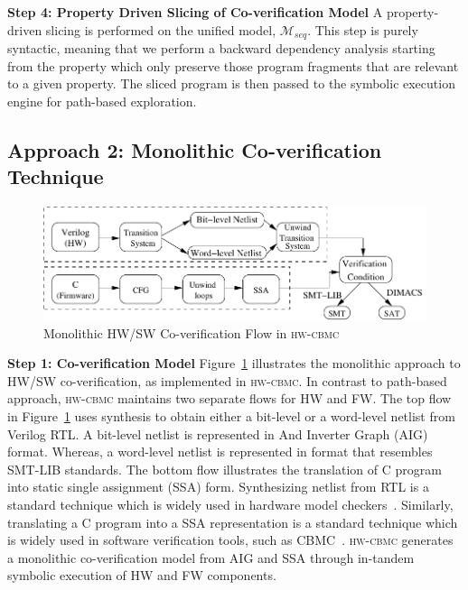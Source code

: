 \documentclass[sigconf]{acmart}
\newcommand{\tool}[1]{\textsc{#1}\xspace}
\newcommand{\hwcbmcv}{\tool{hw-cbmc}}
\newcommand{\verifox}{\tool{CoVeriIf}}
\begin{document}
\textbf{Step 4: Property Driven Slicing of Co-verification Model}
A property-driven slicing is performed on the unified model, $\mathcal{M}_{seq}$.  
This step is purely syntactic, meaning that we perform a backward dependency 
analysis starting from the property which only preserve those 
program fragments that are relevant to a given property. The sliced program 
is then passed to the symbolic execution engine for path-based exploration. \\
%

%
\subsection{Approach 2: Monolithic Co-verification Technique}
%
\begin{figure}[t]
\begin{center}
\includegraphics[scale=0.6]{figures/traditional_flow.pdf}
\caption{Monolithic HW/SW Co-verification Flow in \hwcbmcv}
\label{fig:conventional}
\end{center}
\end{figure}
%
\textbf{Step 1: Co-verification Model}
%
Figure~\ref{fig:conventional} illustrates the monolithic approach to HW/SW
co-veri\-fi\-cation, as implemented in \hwcbmcv.  
In contrast to path-based approach,
\hwcbmcv maintains two separate flows for HW and FW.  The top flow in
Figure~\ref{fig:conventional} uses synthesis to obtain either a bit-level or
a word-level netlist from Verilog RTL.  A bit-level netlist is represented 
in And Inverter Graph (AIG) format.  Whereas, a word-level netlist is represented 
in format that resembles SMT-LIB standards.  The bottom flow illustrates the
translation of C program into static single assignment (SSA) form. 
Synthesizing netlist from RTL is a standard technique which is widely 
used in hardware model checkers~\cite{DBLP:journals/tse/Clarke76}.
Similarly, translating a C program into a SSA representation is a 
standard technique which is widely used in 
software verification tools, such as CBMC~\cite{cbmc.tacas:2004}. 
\hwcbmcv generates a monolithic co-verification model from AIG and SSA through 
in-tandem symbolic execution of HW and FW components.  
\end{document}
